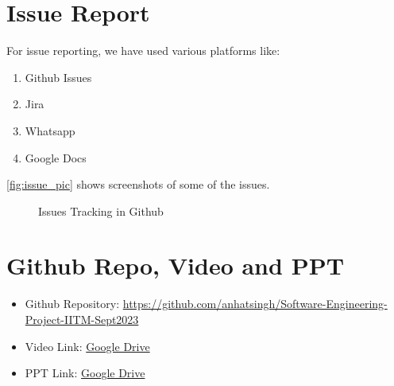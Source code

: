 \newpage
\section{Issue Report}
For issue reporting, we have used various platforms like:
\begin{enumerate}
    \tightlist
    \item Github Issues
    \item Jira
    \item Whatsapp
    \item Google Docs
\end{enumerate}

\autoref{fig:issue_pic} shows screenshots of some of the issues.

\begin{figure}[H]
    \centering
    \caption{Issues Tracking in Github}
    \label{fig:issue_pic}
\end{figure}

\section{Github Repo, Video and PPT}
\begin{itemize}
    \tightlist
    \item Github Repository: \href{https://github.com/anhatsingh/Software-Engineering-Project-IITM-Sept2023}{https://github.com/anhatsingh/Software-Engineering-Project-IITM-Sept2023}
    \item Video Link: \href{https://drive.google.com/file/d/1qBHOFE7LGVQW4yHuSdqfwHbBomY6MLy8/view?usp=drive_link}{Google Drive}
    \item PPT Link: \href{https://docs.google.com/presentation/d/1Vz_nPWuxCOxxy0lo2IrWU29k9SOpYvJk/edit?usp=drive_link&ouid=102662878024311248007&rtpof=true&sd=true}{Google Drive}
\end{itemize}